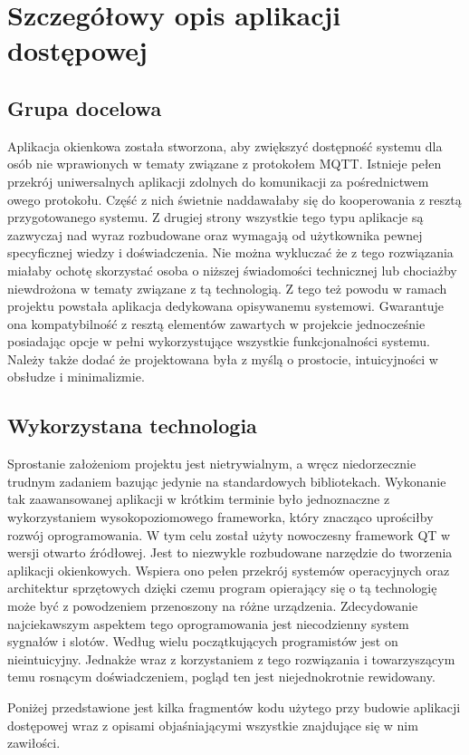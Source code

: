    
\chapter{Szczegółowy opis aplikacji dostępowej}
    \section{Grupa docelowa}
        Aplikacja okienkowa została stworzona, aby zwiększyć dostępność systemu dla osób nie wprawionych w tematy związane z protokołem MQTT. Istnieje pełen przekrój uniwersalnych aplikacji zdolnych do komunikacji za pośrednictwem owego protokołu. Część z nich świetnie naddawałaby się do kooperowania z resztą przygotowanego systemu. Z drugiej strony wszystkie tego typu aplikacje są zazwyczaj nad wyraz rozbudowane oraz wymagają od użytkownika pewnej specyficznej wiedzy i doświadczenia. Nie można wykluczać że z tego rozwiązania miałaby ochotę skorzystać osoba o niższej świadomości technicznej lub chociażby niewdrożona w tematy związane z tą technologią. Z tego też powodu w ramach projektu powstała aplikacja dedykowana opisywanemu systemowi. Gwarantuje ona kompatybilność z resztą elementów zawartych w projekcie jednocześnie posiadając opcje w pełni wykorzystujące wszystkie funkcjonalności systemu. Należy także dodać że projektowana była z myślą o prostocie, intuicyjności w obsłudze i minimalizmie.
        
    \section{Wykorzystana technologia}
        Sprostanie założeniom projektu jest nietrywialnym, a wręcz niedorzecznie trudnym zadaniem bazując jedynie na standardowych bibliotekach. Wykonanie tak zaawansowanej aplikacji w krótkim terminie było jednoznaczne z wykorzystaniem wysokopoziomowego frameworka, który znacząco uprościłby rozwój oprogramowania. W tym celu został użyty  nowoczesny framework QT w wersji otwarto źródłowej. Jest to niezwykle rozbudowane narzędzie do tworzenia aplikacji okienkowych. Wspiera ono pełen przekrój systemów operacyjnych oraz architektur sprzętowych dzięki czemu program opierający się o tą technologię może być z powodzeniem przenoszony na różne urządzenia. Zdecydowanie najciekawszym aspektem tego oprogramowania jest niecodzienny system sygnałów i slotów. Według wielu początkujących programistów jest on nieintuicyjny. Jednakże wraz z korzystaniem z tego rozwiązania i towarzyszącym temu rosnącym doświadczeniem, pogląd ten jest niejednokrotnie rewidowany.  
        
        Poniżej przedstawione jest kilka fragmentów kodu użytego przy budowie aplikacji dostępowej wraz z opisami objaśniającymi wszystkie znajdujące się w nim zawiłości.